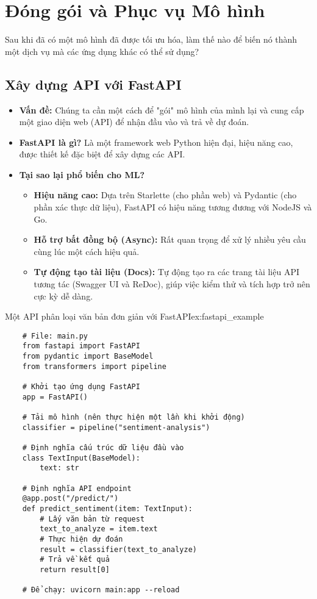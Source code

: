 
\section{Đóng gói và Phục vụ Mô hình}
\label{sec:packaging_serving}
Sau khi đã có một mô hình đã được tối ưu hóa, làm thế nào để biến nó thành một dịch vụ mà các ứng dụng khác có thể sử dụng?

\subsection{Xây dựng API với FastAPI}
\label{ssec:fastapi}
\begin{itemize}
    \item \textbf{Vấn đề:} Chúng ta cần một cách để "gói" mô hình của mình lại và cung cấp một giao diện web (API) để nhận đầu vào và trả về dự đoán.
    \item \textbf{FastAPI là gì?} Là một framework web Python hiện đại, hiệu năng cao, được thiết kế đặc biệt để xây dựng các API.
    \item \textbf{Tại sao lại phổ biến cho ML?}
        \begin{itemize}
            \item \textbf{Hiệu năng cao:} Dựa trên Starlette (cho phần web) và Pydantic (cho phần xác thực dữ liệu), FastAPI có hiệu năng tương đương với NodeJS và Go.
            \item \textbf{Hỗ trợ bất đồng bộ (Async):} Rất quan trọng để xử lý nhiều yêu cầu cùng lúc một cách hiệu quả.
            \item \textbf{Tự động tạo tài liệu (Docs):} Tự động tạo ra các trang tài liệu API tương tác (Swagger UI và ReDoc), giúp việc kiểm thử và tích hợp trở nên cực kỳ dễ dàng.
        \end{itemize}
\end{itemize}
\begin{example}{Một API phân loại văn bản đơn giản với FastAPI}{ex:fastapi_example}
    \begin{verbatim}
    # File: main.py
    from fastapi import FastAPI
    from pydantic import BaseModel
    from transformers import pipeline

    # Khởi tạo ứng dụng FastAPI
    app = FastAPI()

    # Tải mô hình (nên thực hiện một lần khi khởi động)
    classifier = pipeline("sentiment-analysis")

    # Định nghĩa cấu trúc dữ liệu đầu vào
    class TextInput(BaseModel):
        text: str

    # Định nghĩa API endpoint
    @app.post("/predict/")
    def predict_sentiment(item: TextInput):
        # Lấy văn bản từ request
        text_to_analyze = item.text
        # Thực hiện dự đoán
        result = classifier(text_to_analyze)
        # Trả về kết quả
        return result[0]

    # Để chạy: uvicorn main:app --reload
    \end{verbatim}
\end{example}

